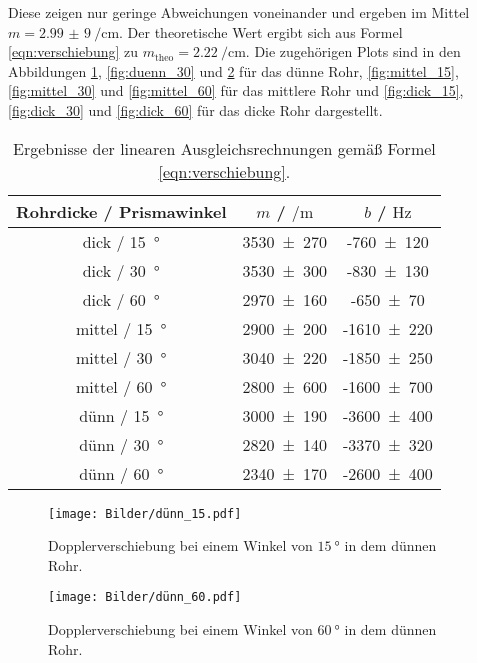 Diese zeigen nur geringe Abweichungen voneinander und ergeben im
Mittel $m = \SI{2,99(9)}{\per\centi\meter}$. Der theoretische Wert ergibt sich aus Formel
\eqref{eqn:verschiebung} zu $m_{\mathrm{theo}} = \SI{2,22}{\per\centi\meter}$.
Die zugehörigen Plots sind in den Abbildungen \ref{fig:duenn_15}, \ref{fig:duenn_30} und
\ref{fig:duenn_60} für das dünne Rohr, \ref{fig:mittel_15}, \ref{fig:mittel_30} und
\ref{fig:mittel_60} für das mittlere Rohr und \ref{fig:dick_15}, \ref{fig:dick_30} und
\ref{fig:dick_60} für das dicke Rohr dargestellt.
\begin{table}
	\centering
	\caption{Ergebnisse der linearen Ausgleichsrechnungen gemäß Formel \eqref{eqn:verschiebung}.}
	\label{tab:fitcoeff}
	\begin{tabular}{ccc}
		\toprule
		Rohrdicke / Prismawinkel & $m$ / $\si{\per\meter}$ & $b$ / $\si{\hertz}$ \\
		\midrule
		dick / \SI{15}{\degree} & \num{3530(270)} & -\num{760(120)} \\
		dick / \SI{30}{\degree} & \num{3530(300)} & -\num{830(130)} \\
		dick / \SI{60}{\degree} & \num{2970(160)} & -\num{650(70)} \\
		mittel / \SI{15}{\degree} & \num{2900(200)} & -\num{1610(220)} \\
		mittel / \SI{30}{\degree} & \num{3040(220)} & -\num{1850(250)} \\
		mittel / \SI{60}{\degree} & \num{2800(600)} & -\num{1600(700)} \\
		dünn / \SI{15}{\degree} & \num{3000(190)} & -\num{3600(400)} \\
		dünn / \SI{30}{\degree} & \num{2820(140)} & -\num{3370(320)} \\
		dünn / \SI{60}{\degree} & \num{2340(170)} & -\num{2600(400)} \\
		\bottomrule
	\end{tabular}
\end{table}
\begin{figure}
	 \centering
	  \caption{Dopplerverschiebung bei einem Winkel von $\SI{15}{\degree}$ in dem dünnen Rohr.}
	   \texttt{[image: Bilder/dünn\_15.pdf]}
	    \label{fig:duenn_15}
\end{figure}

\begin{figure}
	 \centering
	  \caption{Dopplerverschiebung bei einem Winkel von $\SI{60}{\degree}$ in dem dünnen Rohr.}
	   \texttt{[image: Bilder/dünn\_60.pdf]}
	    \label{fig:duenn_60}
\end{figure}

